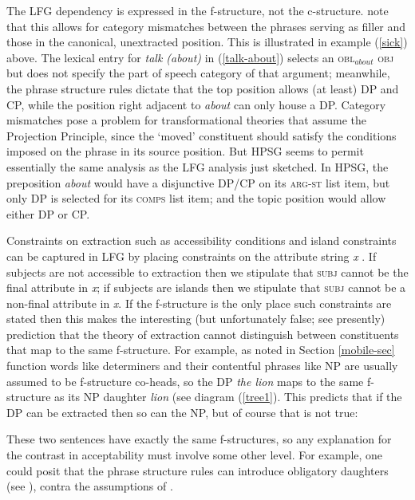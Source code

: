 The LFG dependency is expressed in the f-structure, not the c-structure.  \citet[chapter 2]{BATW2015a} note that this allows for category mismatches between the phrases serving as filler and those in the canonical, unextracted position.  This is illustrated in example (\ref{sick}) above.  The lexical entry for \textit{talk (about)} in (\ref{talk-about}) selects an \textsc{obl}$_{about}$ \textsc{obj} but does not specify the part of speech category of that argument; meanwhile, the phrase structure rules dictate that the top position allows (at least) DP and CP, while the position right adjacent to \textit{about} can only house a DP.   Category mismatches pose a problem for transformational theories that assume the Projection Principle, since the `moved' constituent should satisfy the conditions imposed on the phrase in its source position.  But HPSG seems to permit essentially the same analysis as the LFG analysis just sketched.   In HPSG, the preposition \textit{about} would have a disjunctive DP/CP on its \textsc{arg-st} list item, but only DP is selected for its \textsc{comps} list item; and the topic position would allow either DP or CP.  

Constraints on extraction such as accessibility conditions and island constraints  can be captured in LFG by placing constraints on the attribute string \textit{x} \citep{dalrymple;ea19}.  If subjects are not accessible to extraction then we stipulate that \textsc{subj} cannot be the final attribute in \textit{x}; if subjects are islands then we stipulate that \textsc{subj} cannot be a non-final attribute in \textit{x}.  If the f-structure is the only place such constraints are stated then 
this makes the interesting (but unfortunately false; see presently) prediction that the theory of extraction cannot distinguish between constituents that map to the same f-structure.  For example, as noted in Section \ref{mobile-sec} function words like determiners and their contentful phrases like NP are usually assumed to be f-structure co-heads, so the DP \textit{the lion} maps to the same f-structure as its NP daughter \textit{lion} (see diagram (\ref{tree1}).  This predicts that if the DP can be extracted then so can the NP, but of course that is not true:

\begin{exe} 
\ex	\label{nope}
\begin{xlist}
\end{xlist}
\end{exe}
These two sentences have exactly the same f-structures, so any explanation for the contrast in acceptability must involve some other level.  For example, one could posit that the phrase structure rules can introduce obligatory daughters (see \cite[239]{snijders15}), contra the assumptions of \citet{BATW2015a}.  

